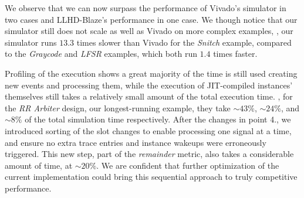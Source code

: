 We observe that we can now surpass the performance of Vivado's simulator in two cases and LLHD-Blaze's performance in one case. We though notice that our simulator still does not scale as well as Vivado on more complex examples, \eg, our simulator runs $13.3$ times slower than Vivado for the \textit{Snitch} example, compared to the \textit{Graycode} and \textit{LFSR} examples, which both run $1.4$ times faster.

Profiling of the execution shows a great majority of the time is still used creating new events and processing them, while the execution of JIT-compiled instances' themselves still takes a relatively small amount of the total execution time. \Eg, for the \textit{RR Arbiter} design, our longest-running example, they take $\sim$$43\%$, $\sim$$24\%$, and $\sim$$8\%$ of the total simulation time respectively. After the changes in point 4., we introduced sorting of the slot changes to enable processing one signal at a time, and ensure no extra trace entries and instance wakeups were erroneously triggered. This new step, part of the \textit{remainder} metric, also takes a considerable amount of time, at $\sim$$20\%$. We are confident that further optimization of the current implementation could bring this sequential approach to truly competitive performance.

